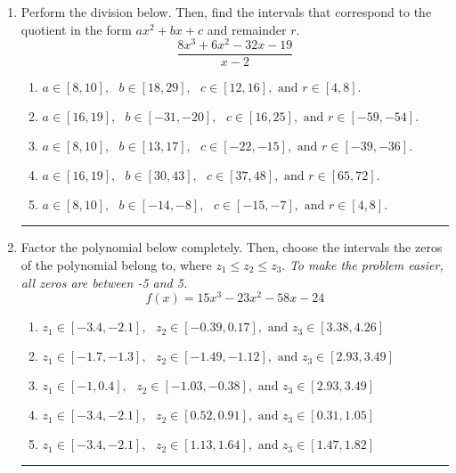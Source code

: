 \documentclass[14pt]{extbook}
\newcommand{\litem}[1]{\item#1\hspace*{-1cm}\rule{\textwidth}{0.4pt}}
\begin{document}
\begin{enumerate}
{\begin{enumerate}[label=\Alph*.]
\end{enumerate} }
\litem{
Perform the division below. Then, find the intervals that correspond to the quotient in the form $ax^2+bx+c$ and remainder $r$.\[ \frac{8x^{3} +6 x^{2} -32 x -19}{x -2} \]\begin{enumerate}[label=\Alph*.]
\item \( a \in [8, 10], \text{   } b \in [18, 29], \text{   } c \in [12, 16], \text{   and   } r \in [4, 8]. \)
\item \( a \in [16, 19], \text{   } b \in [-31, -20], \text{   } c \in [16, 25], \text{   and   } r \in [-59, -54]. \)
\item \( a \in [8, 10], \text{   } b \in [13, 17], \text{   } c \in [-22, -15], \text{   and   } r \in [-39, -36]. \)
\item \( a \in [16, 19], \text{   } b \in [30, 43], \text{   } c \in [37, 48], \text{   and   } r \in [65, 72]. \)
\item \( a \in [8, 10], \text{   } b \in [-14, -8], \text{   } c \in [-15, -7], \text{   and   } r \in [4, 8]. \)

\end{enumerate} }
\litem{
Factor the polynomial below completely. Then, choose the intervals the zeros of the polynomial belong to, where $z_1 \leq z_2 \leq z_3$. \textit{To make the problem easier, all zeros are between -5 and 5.}\[ f(x) = 15x^{3} -23 x^{2} -58 x -24 \]\begin{enumerate}[label=\Alph*.]
\item \( z_1 \in [-3.4, -2.1], \text{   }  z_2 \in [-0.39, 0.17], \text{   and   } z_3 \in [3.38, 4.26] \)
\item \( z_1 \in [-1.7, -1.3], \text{   }  z_2 \in [-1.49, -1.12], \text{   and   } z_3 \in [2.93, 3.49] \)
\item \( z_1 \in [-1, 0.4], \text{   }  z_2 \in [-1.03, -0.38], \text{   and   } z_3 \in [2.93, 3.49] \)
\item \( z_1 \in [-3.4, -2.1], \text{   }  z_2 \in [0.52, 0.91], \text{   and   } z_3 \in [0.31, 1.05] \)
\item \( z_1 \in [-3.4, -2.1], \text{   }  z_2 \in [1.13, 1.64], \text{   and   } z_3 \in [1.47, 1.82] \)

\end{enumerate} }
\end{enumerate}
\end{document}
